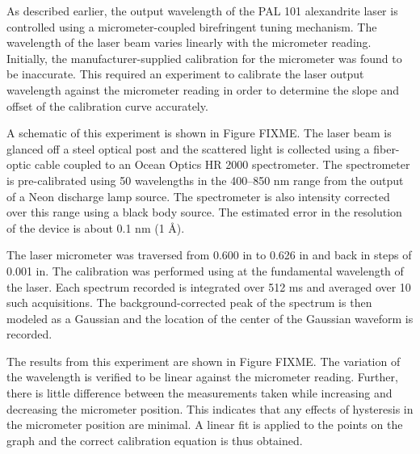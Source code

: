 As described earlier, the output wavelength of the PAL 101 alexandrite laser is controlled using a micrometer-coupled birefringent tuning mechanism.
The wavelength of the laser beam varies linearly with the micrometer reading.
Initially, the manufacturer-supplied calibration for the micrometer was found to be inaccurate.
This required an experiment to calibrate the laser output wavelength against the micrometer reading in order to determine the slope and offset of the calibration curve accurately.

A schematic of this experiment is shown in Figure FIXME.
The laser beam is glanced off a steel optical post and the scattered light is collected using a fiber-optic cable coupled to an Ocean Optics HR 2000 spectrometer.
The spectrometer is pre-calibrated using 50 wavelengths in the 400--850 nm range from the output of a Neon discharge lamp source.
The spectrometer is also intensity corrected over this range using a black body source.
The estimated error in the resolution of the device is about 0.1 nm (1 \AA).

The laser micrometer was traversed from 0.600 in to 0.626 in and back in steps of 0.001 in.
The calibration was performed using at the fundamental wavelength of the laser.
Each spectrum recorded is integrated over 512 ms and averaged over 10 such acquisitions.
The background-corrected peak of the spectrum is then modeled as a Gaussian and the location of the center of the Gaussian waveform is recorded.

The results from this experiment are shown in Figure FIXME.
The variation of the wavelength is verified to be linear against the micrometer reading.
Further, there is little difference between the measurements taken while increasing and decreasing the micrometer position.
This indicates that any effects of hysteresis in the micrometer position are minimal.
A linear fit is applied to the points on the graph and the correct calibration equation is thus obtained.


